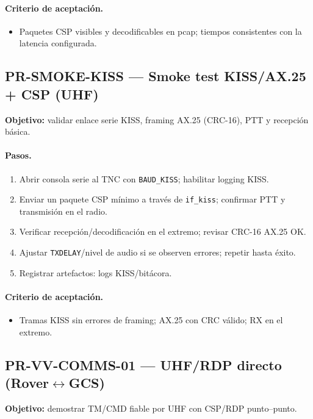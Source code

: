 \paragraph{Criterio de aceptación.}
\begin{itemize}
  \item Paquetes CSP visibles y decodificables en pcap; tiempos consistentes con la latencia configurada.
\end{itemize}

\subsection*{PR-SMOKE-KISS — Smoke test KISS/AX.25 + CSP (UHF)}
\textbf{Objetivo:} validar enlace serie KISS, framing AX.25 (CRC-16), PTT y recepción básica.

\paragraph{Pasos.}
\begin{enumerate}
  \item Abrir consola serie al TNC con \texttt{BAUD\_KISS}; habilitar logging KISS.
  \item Enviar un paquete CSP mínimo a través de \texttt{if\_kiss}; confirmar PTT y transmisión en el radio.
  \item Verificar recepción/decodificación en el extremo; revisar CRC-16 AX.25 OK.
  \item Ajustar \texttt{TXDELAY}/nivel de audio si se observen errores; repetir hasta éxito.
  \item Registrar artefactos: logs KISS/bitácora.
\end{enumerate}

\paragraph{Criterio de aceptación.}
\begin{itemize}
  \item Tramas KISS sin errores de framing; AX.25 con CRC válido; RX en el extremo.
\end{itemize}

\subsection*{PR-VV-COMMS-01 — UHF/RDP directo (Rover$\leftrightarrow$GCS)}
\textbf{Objetivo:} demostrar TM/CMD fiable por UHF con CSP/RDP punto–punto.

